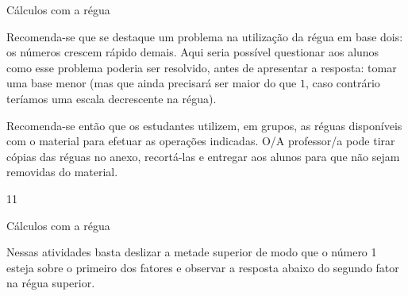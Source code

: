 \begin{sugestions}{Cálculos com a régua}
{
	Recomenda-se que se destaque um problema na utilização da régua em base dois: os números crescem rápido demais. Aqui seria possível questionar aos alunos como esse problema poderia ser resolvido, antes de apresentar a resposta: tomar uma base menor (mas que ainda precisará ser maior do que $1$, caso contrário teríamos uma escala decrescente na régua).

Recomenda-se então que os estudantes utilizem, em grupos, as réguas disponíveis com o material para efetuar as operações indicadas. O/A professor/a pode tirar cópias das réguas no anexo, recortá-las e entregar aos alunos para que não sejam removidas do material.
}{1}{1}
\end{sugestions}
\begin{answer}{Cálculos com a régua}
{
	Nessas atividades basta deslizar a metade superior de modo que o número 1 esteja sobre o primeiro dos fatores e observar a resposta abaixo do segundo fator na régua superior.

}
\end{answer}
